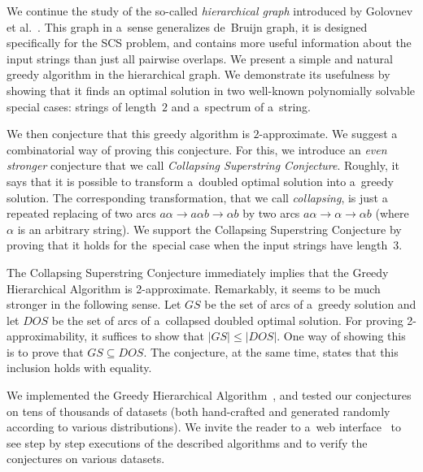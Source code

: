 We continue the study of the so-called {\em hierarchical graph}
introduced by Golovnev et al.~\cite{scs_exact}. This graph in a~sense generalizes de~Bruijn graph, it is designed specifically 
for the SCS problem, and contains more useful information about the input strings
than just all pairwise overlaps. We present a simple and natural greedy algorithm
in the hierarchical graph. 
We demonstrate its usefulness by showing that it finds an optimal solution 
in two well-known polynomially solvable special cases: strings of length~$2$ and
a~spectrum of a~string.

We then conjecture that this greedy algorithm is $2$-approximate. We suggest a combinatorial way of proving this conjecture. For this, we introduce an {\em even stronger} conjecture that we call 
{\em Collapsing Superstring Conjecture}. 
Roughly, it says that it is possible to transform a~doubled optimal 
solution into a~greedy solution. 
The corresponding transformation, that we call {\em collapsing}, 
is just a repeated replacing of two arcs $a\alpha \to a\alpha b \to \alpha b$ 
by two arcs $a\alpha \to \alpha \to \alpha b$ (where $\alpha$ is an arbitrary string). 
We support the Collapsing Superstring Conjecture by 
proving that it holds for the~special case when the input strings have length~3.



The Collapsing Superstring Conjecture immediately implies that the Greedy
Hierarchical Algorithm is 2-approximate. Remarkably, it seems to be much
stronger in the following sense. Let $GS$ be the set of arcs of a~greedy
solution and let $DOS$ be the set of arcs of a~collapsed doubled optimal
solution. For proving 2-approximability, it suffices to show that $|GS| \le |DOS|$. 
One way of showing this is to prove that $GS \subseteq DOS$. 
The conjecture, at the same time, states that this inclusion holds with equality.

We implemented the Greedy Hierarchical Algorithm~\cite{github}, and tested our conjectures on tens of thousands of datasets (both hand-crafted and generated randomly according to various distributions). 
We invite the reader to a~web interface~\cite{webpage} to see step by step executions of the described algorithms and to verify the conjectures on
various datasets.
